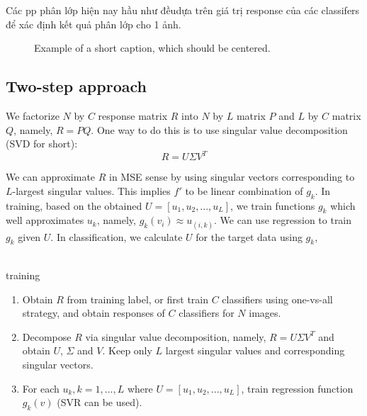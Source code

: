 \documentclass[preprint]{elsarticle}
\begin{document}
 
 Các pp phân lớp hiện nay hầu như đềudựa trên giá trị response của các classifers để xác định kết quả phân lớp cho 1 ảnh. 



\begin{figure}
\begin{center}
\fbox{\rule{0pt}{2in} \rule{.9\linewidth}{0pt}}
\end{center}
   \caption{Example of a short caption, which should be centered.}
\label{fig:short}
\end{figure}

\subsection{Two-step approach}
We factorize $N$ by $C$ response matrix $R$ into $N$ by $L$ matrix $P$ and $L$ by $C$ matrix $Q$, namely, $R=PQ$. One way to do this is to use singular value decomposition (SVD for short):
\begin{equation}
R = U \Sigma V^T \label{eq:svds}
\end{equation}

We can approximate $R$ in MSE sense by using singular vectors corresponding to $L$-largest singular values. This implies $f'$ to be linear combination of $g_k$. In training, based on the obtained $U=[u_1,u_2,...,u_L]$, we train functions $g_k$ which well approximates $u_k$, namely, $g_k(v_i) \approx u_{(i,k)}$. We can use regression to train $g_k$ given $U$. In classification, we calculate $U$ for the target data using $g_k$,
\\
\\

\begin{algorithm}
  	\caption{training}\label{alg_training}
  	\begin{algorithmic}
	\State 
	\begin{enumerate}[Step 1.]
	\item Obtain $R$ from training label, or first train $C$ classifiers using one-vs-all strategy, and obtain responses of $C$ classifiers for $N$ images.
 
	\item Decompose $R$ via singular value decomposition, namely, $R = U \Sigma V^T$ and obtain $U$, $\Sigma$ and $V$. Keep only $L$ largest singular values and corresponding singular vectors.

	\item For each $u_k, k=1,...,L$ where $U=[u_1,u_2,...,u_L]$, train regression function $g_k(v)$ (SVR can be used).
\end{enumerate}
	\end{algorithmic}
\end{algorithm}
\end{document}
